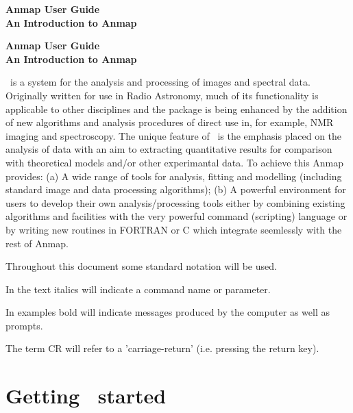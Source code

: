 

\begin{center}
\vspace*{4.0cm}
{\Large\bf Anmap User Guide} \\
\vspace{1.0cm}
{\Large\bf An Introduction to Anmap}
\end{center}

\newpage
\begin{center}
{\Large\bf Anmap User Guide} \\
\vspace{1.0cm}
{\Large\bf An Introduction to Anmap}
\end{center}
\vspace{1.0cm}

\Anmap\ is a system for the analysis and processing of images
and spectral data.  Originally written for use in Radio Astronomy,
much of its functionality is applicable to other disciplines and
the package is being enhanced by the addition of new algorithms
and analysis procedures of direct use in, for example, NMR
imaging and spectroscopy.  The unique feature of \Anmap\ is the
emphasis placed on the analysis of data with an aim to extracting
quantitative results for comparison with theoretical models
and/or other experimantal data.  To achieve this Anmap provides:
(a) A wide range of tools for analysis, fitting and modelling
(including standard image and data processing algorithms);
(b) A powerful environment for users to develop their own
analysis/processing tools either by combining existing 
algorithms and facilities with the very powerful command
(scripting) language or by writing new routines in FORTRAN or C
which integrate seemlessly with the rest of Anmap.  
 
Throughout this document some standard notation will be used.
\begin{apars}
\item In the text italics will indicate a command name or parameter.
\item In examples bold will indicate messages produced by the
computer as well as prompts.
\item The term CR will refer to a 'carriage-return' (i.e.
pressing the return key).
\end{apars}

\section{Getting \Anmap\ started}
 
